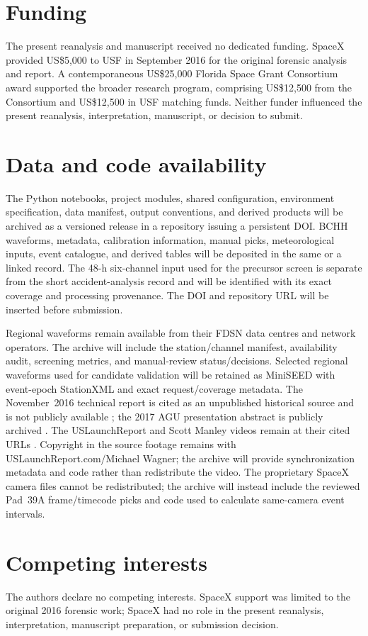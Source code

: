 \documentclass[]{seismica}
\begin{document}
\section*{Funding}

The present reanalysis and manuscript received no dedicated funding. SpaceX
provided US\$5,000 to USF in September 2016 for the original forensic analysis
and report. A contemporaneous US\$25,000 Florida Space Grant Consortium award
supported the broader research program, comprising US\$12,500 from the
Consortium and US\$12,500 in USF matching funds. Neither funder influenced the
present reanalysis, interpretation, manuscript, or decision to submit.


\section*{Data and code availability}

The Python notebooks, project modules, shared configuration, environment
specification, data manifest, output conventions, and derived products will be
archived as a versioned release in a repository issuing a persistent DOI. BCHH
waveforms, metadata, calibration information, manual picks, meteorological
inputs, event catalogue, and derived tables will be deposited in the same or a
linked record. The 48-h six-channel input used for the precursor screen is
separate from the short accident-analysis record and will be identified with
its exact coverage and processing provenance. The DOI and repository URL will be inserted before submission.

Regional waveforms remain available from their FDSN data centres and network
operators. The archive will include the station/channel manifest, availability
audit, screening metrics, and manual-review status/decisions. Selected regional
waveforms used for candidate validation will be retained as MiniSEED with
event-epoch StationXML and exact request/coverage metadata. The November~2016
technical report is cited as an unpublished historical source and is not
publicly available \citep{thompson_mcnutt_fireball_2016}; the 2017 AGU
presentation abstract is publicly archived \citep{thompson_agu_falcon9_2017}. The USLaunchReport and
Scott Manley videos remain at their cited URLs
\citep{uslaunchreport_amos6_video_2016,manley_spacex_explosion_2016}. Copyright
in the source footage remains with USLaunchReport.com/Michael Wagner; the
archive will provide synchronization metadata and code rather than redistribute
the video. The proprietary SpaceX camera files cannot be redistributed; the
archive will instead include the reviewed Pad~39A frame/timecode picks and code
used to calculate same-camera event intervals.


\section*{Competing interests}

The authors declare no competing interests. SpaceX support was limited to the
original 2016 forensic work; SpaceX had no role in the present reanalysis,
interpretation, manuscript preparation, or submission decision.


\end{document}
